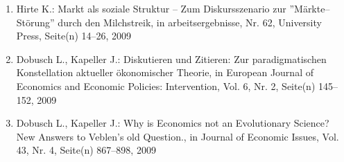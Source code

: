 \begin{enumerate}
	 \item Hirte K.: Markt als soziale Struktur -- Zum Diskursszenario zur ''Märkte--Störung'' durch den Milchstreik, in arbeitsergebnisse, Nr. 62, University Press, Seite(n) 14--26, 2009
	 \item Dobusch L., Kapeller J.: Diskutieren und Zitieren: Zur paradigmatischen Konstellation aktueller ökonomischer Theorie, in European Journal of Economics and Economic Policies: Intervention, Vol. 6, Nr. 2, Seite(n) 145--152, 2009
	 \item Dobusch L., Kapeller J.: Why is Economics not an Evolutionary Science? New Answers to Veblen's old Question., in Journal of Economic Issues, Vol. 43, Nr. 4, Seite(n) 867--898, 2009
\end{enumerate}
